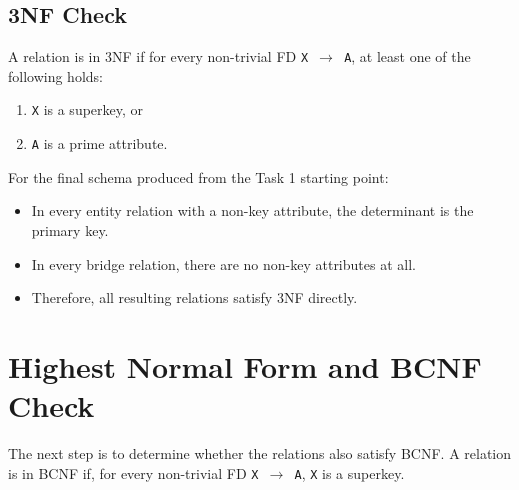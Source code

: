 \documentclass[12pt,a4paper]{article}
\begin{document}
\subsection{3NF Check}
A relation is in 3NF if for every non-trivial FD \texttt{X $\rightarrow$ A}, at least one of the
following holds:

\begin{enumerate}[leftmargin=1.5em]
    \item \texttt{X} is a superkey, or
    \item \texttt{A} is a prime attribute.
\end{enumerate}

For the final schema produced from the Task 1 starting point:

\begin{itemize}[leftmargin=1.5em]
    \item In every entity relation with a non-key attribute, the determinant is the primary key.
    \item In every bridge relation, there are no non-key attributes at all.
    \item Therefore, all resulting relations satisfy 3NF directly.
\end{itemize}

\section{Highest Normal Form and BCNF Check}
The next step is to determine whether the relations also satisfy BCNF. A relation is in BCNF if,
for every non-trivial FD \texttt{X $\rightarrow$ A}, \texttt{X} is a superkey.
\end{document}
